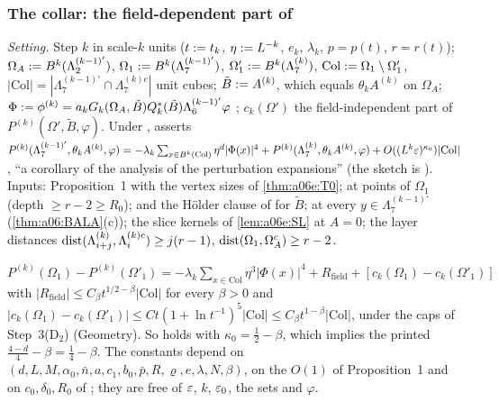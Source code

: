 
\subsubsection*{The collar: the field-dependent part of \cite[Prop.~2.1, (2.57)]{Ba2}}

\emph{Setting.} Step $k$ in scale-$k$ units ($t:= t_k$, $\eta:= L^{-k}$, $e_k$, $\lambda_k$, $p=p(t)$, $r=r(t)$); $\Omega_A:= B^k(\Lambda^{(k-1)'}_2)$, $\Omega_1:= B^k(\Lambda^{(k-1)'}_7)$, $\Omega'_1:= B^k(\Lambda^{(k)}_7)$, $\mathrm{Col}:=\Omega_1\setminus\Omega'_1$, $|\mathrm{Col}|=|\Lambda^{(k-1)'}_7\cap\Lambda^{(k)c}_7|$ unit cubes; $\tilde B:= A^{(k)}$, which equals $\theta_kA^{(k)}$ on $\Omega_A$; $\Phi:=\phi^{(k)}=a_kG_k(\Omega_A,\tilde B)Q_k^*(\tilde B)\Lambda^{(k-1)'}_6\varphi$ \cite[(2.56)]{Ba2}; $c_k(\Omega')$ the field-independent part of $P^{(k)}(\Omega',\tilde B,\varphi)$. Under \cite[(2.55)]{Ba2}, \cite[Prop.~2.1, (2.57)]{Ba2} asserts $P^{(k)}(\Lambda^{(k-1)'}_7,\theta_kA^{(k)},\varphi)=-\lambda_k\sum_{x\in B^k(\mathrm{Col})}\eta^d|\Phi(x)|^4+P^{(k)}(\Lambda^{(k)}_7,\theta_kA^{(k)},\varphi)+O((L^k\varepsilon)^{\kappa_0})|\mathrm{Col}|$, ``a corollary of the analysis of the perturbation expansions'' (the sketch is \cite[p.~421]{Ba3}). Inputs: Proposition~1 with the vertex sizes of \cref{thm:a06e:T0}; \cite[(2.24)--(2.25)]{Ba1} at points of $\Omega_1$ (depth $\ge r-2\ge R_0$); \cite[(2.55), (2.60)]{Ba2} and the H\"older clause of \cite[p.~412]{Ba3} for $\tilde B$; \cite[Lemma~2.4, (2.65)--(2.66)]{Ba2} at every $y\in\Lambda^{(k-1)'}_7$ (\cref{thm:a06:BALA}(c)); the slice kernels of \cref{lem:a06e:SL} at $A=0$; the layer distances $\operatorname{dist}(\Lambda^{(k)}_{i+j},\Lambda^{(k)c}_i)\ge j(r-1)$, $\operatorname{dist}(\Omega_1,\Omega_A^c)\ge r-2$.

\begin{theorem}\label{thm:a06f:C2}
$P^{(k)}(\Omega_1)-P^{(k)}(\Omega'_1)=-\lambda_k\sum_{x\in\mathrm{Col}}\eta^3|\Phi(x)|^4+R_{\mathrm{field}}+[c_k(\Omega_1)-c_k(\Omega'_1)]$ with $|R_{\mathrm{field}}|\le C_\beta t^{1/2-\beta}|\mathrm{Col}|$ for every $\beta>0$ and $|c_k(\Omega_1)-c_k(\Omega'_1)|\le Ct(1+\ln t^{-1})^5|\mathrm{Col}|\le C_\beta t^{1-\beta}|\mathrm{Col}|$, under the caps of Step~3(D$_2$) (Geometry). So \cite[(2.57)]{Ba2} holds with $\kappa_0=\frac12-\beta$, which implies the printed $\frac{4-d}4-\beta=\frac14-\beta$. The constants depend on $(d,L,M,\alpha_0,\bar n,a,c_1,b_0,\bar p,R,\varrho,e,\lambda,N,\beta)$, on the $O(1)$ of Proposition~1 and on $c_0,\delta_0,R_0$ of \cite[(2.24)]{Ba1}; they are free of $\varepsilon$, $k$, $\varepsilon_0$, the sets and $\varphi$.
\end{theorem}

